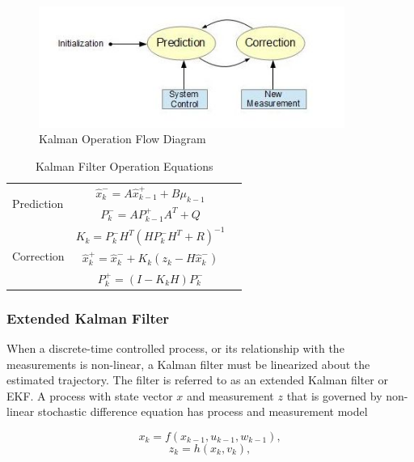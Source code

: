 \begin{figure}[h]
\centering
\includegraphics[width=10cm, keepaspectratio=true]{./Figures/KalmanOperation.jpg}
\caption{Kalman Operation Flow Diagram}
\label{figch2:1}
\end{figure}

\begin{table}
\caption{Kalman Filter Operation Equations}
\label{tab:KF}
\centering
\begin{tabular}{|l|c r|}
\hline
\multirow{2}{*}{Prediction} 
& $\hat{x}^-_k=A\hat{x}^+_{k-1}+B\mu_{k-1}$ & \stepcounter{equation}\thetag{\theequation}\\
& $P^-_k = AP^+_{k-1}A^T+Q$ & \stepcounter{equation}\thetag{\theequation}\\
\hline
\multirow{3}{*}{Correction}
& $K_k=P^-_kH^T(HP^-_kH^T+R)^{-1}$  & \stepcounter{equation}\thetag{\theequation}\\
& $\hat{x}^+_k = \hat{x}^-_k+K_k(z_k-H\hat{x}^-_k)$ & \stepcounter{equation}\thetag{\theequation}\\
& $P^+_k = (I-K_kH)P^-_k$ & \stepcounter{equation}\thetag{\theequation}\\
\hline
\end{tabular}
\end{table}
\FloatBarrier

\subsubsection{Extended Kalman Filter}
When a discrete-time controlled process, or its relationship with the
measurements is non-linear, a Kalman filter must be linearized about
the estimated trajectory. The filter is referred to as an extended
Kalman filter or EKF. A process with state vector $x$ and measurement
$z$ that is governed by non-linear stochastic difference equation has
process and measurement model

\begin{equation}
x_k=f(x_{k-1}, u_{k-1}, w_{k-1}),
\end{equation}
\begin{equation}
z_k=h(x_k, v_k),
\end{equation}

